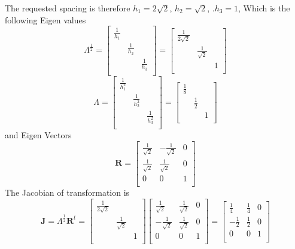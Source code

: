 \documentclass{article}
\begin{document}
The requested spacing is therefore $h_1=2\sqrt{2}$, $h_2=\sqrt{2}$, .$h_3=1$, 
Which is the following Eigen values
\begin{equation}
 \Lambda^\frac{1}{2}=
 \left[\begin{array}{ccc}
   \frac{1}{h_1}&&\\
   &\frac{1}{h_2}&\\
   &&\frac{1}{h_3}\\
 \end{array}\right]
 =
 \left[\begin{array}{ccc}
   \frac{1}{2\sqrt{2}}&&\\
   &\frac{1}{\sqrt{2}}&\\
   &&1\\
 \end{array}\right]
\end{equation}
\begin{equation}
 \Lambda=
 \left[\begin{array}{ccc}
   \frac{1}{h_1^2}&&\\
   &\frac{1}{h_2^2}&\\
   &&\frac{1}{h_3^2}\\
 \end{array}\right]
 =
 \left[\begin{array}{ccc}
   \frac{1}{8}&&\\
   &\frac{1}{2}&\\
   &&1\\
 \end{array}\right]
\end{equation}
and Eigen Vectors
\begin{equation}
 \mathbf{R}=\left[
 \begin{array}{ccc}
   \frac{1}{\sqrt{2}}&-\frac{1}{\sqrt{2}}&0\\
   \frac{1}{\sqrt{2}}&\frac{1}{\sqrt{2}}&0\\
   0&0&1\\
 \end{array}\right]
\end{equation}
The Jacobian of transformation is
\begin{equation}
 \mathbf{J}=\Lambda^\frac{1}{2}\mathbf{R}^t=
 \left[\begin{array}{ccc}
   \frac{1}{2\sqrt{2}}&&\\
   &\frac{1}{\sqrt{2}}&\\
   &&1\\
 \end{array}\right]
 \left[\begin{array}{ccc}
   \frac{1}{\sqrt{2}}&\frac{1}{\sqrt{2}}&0\\
   -\frac{1}{\sqrt{2}}&\frac{1}{\sqrt{2}}&0\\
   0&0&1\\
 \end{array}\right]
 =
 \left[\begin{array}{ccc}
   \frac{1}{4}&\frac{1}{4}&0\\
   -\frac{1}{2}&\frac{1}{2}&0\\
   0&0&1\\
 \end{array}\right]
\end{equation}
\end{document}
